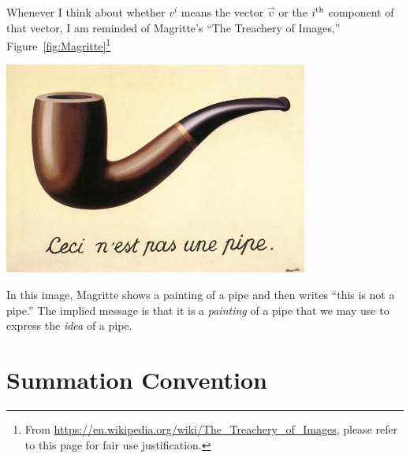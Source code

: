 \documentclass[12pt, oneside]{report}    %
\let\oldsection\section
\def\section{%
  \setcounter{sidenote}{1}%
  \oldsection
}
\begin{document}
Whenever I think about whether $v^i$ means the vector $\vec{v}$ or the $i^\textnormal{th}$ component of that vector, I am reminded of Magritte's ``The Treachery of Images,'' Figure~\ref{fig:Magritte}\footnote{From \url{https://en.wikipedia.org/wiki/The_Treachery_of_Images}, please refer to this page for fair use justification.}
\begin{marginfigure}%
    \includegraphics[width=.8\textwidth]{figures/MagrittePipe.jpg}
    \caption{``La Trahison des Images'' (``The Treachery of Images'') by Ren\'e Magritte. Owned by , reproduced here under fair use.}
    \label{fig:Magritte}
\end{marginfigure}
In this image, Magritte shows a painting of a pipe and then writes ``this is not a pipe.'' The implied message is that it is a \emph{painting} of a pipe that we may use to express the \emph{idea} of a pipe.


\section{Summation Convention}
\label{sec:summation}
\end{document}
